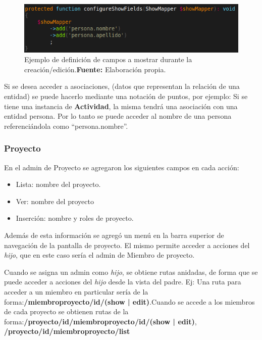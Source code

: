 \begin{figure}[h]
    \includegraphics[width=1\linewidth]{image/show.png}
    \caption{Ejemplo de definición de campos a mostrar durante la creación/edición.\newline \textbf{Fuente:} Elaboración propia.}
    \label{fig:image/show}
\end{figure}

Si se desea acceder a asociaciones, (datos que representan la relación de una entidad) se puede hacerlo mediante una notación de puntos, por ejemplo:
Si se tiene una instancia de \textbf{Actividad}, la misma tendrá una asociación con una entidad persona. Por lo tanto se puede acceder al nombre de una persona referenciándola como ``persona.nombre''.

\subsubsection{Proyecto}%
\label{ssub:admin_proyectadmin_proyecto}

En el admin de Proyecto se agregaron los siguientes campos en cada acción:

\begin{itemize}
    \item Lista: nombre del proyecto.
    \item Ver: nombre del proyecto
    \item Inserción: nombre y roles de proyecto.
\end{itemize}

Además de esta información se agregó un menú en la barra superior de navegación de la pantalla de proyecto. El mismo permite acceder a acciones del \textit{hijo},
que en este caso sería el admin de Miembro de proyecto.

Cuando se asigna un admin como \textit{hijo}, se obtiene rutas anidadas, de forma que se puede acceder a acciones del \textit{hijo} desde la vista del padre. Ej: Una ruta
para acceder a un miembro en particular sería de la forma:\newline \textbf{/miembroproyecto/{id}/(show | edit)}\@.\newline\newline Cuando se accede a los miembros de cada proyecto se obtienen rutas de la forma:\newline \textbf{/proyecto/{id}/miembroproyecto/{id}/(show | edit)},
\newline \textbf{/proyecto/{id}/miembroproyecto/list}\newline

